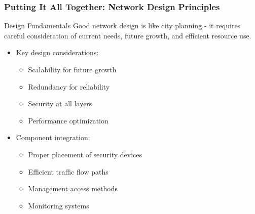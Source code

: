 \documentclass{beamer}
\begin{document}
\begin{frame}
    \frametitle{Putting It All Together: Network Design Principles}
    
    \begin{block}{Design Fundamentals}
        Good network design is like city planning - it requires careful consideration of current needs, future growth, and efficient resource use.
    \end{block}
    
    \begin{itemize}
        \item Key design considerations:
        \begin{itemize}
            \item Scalability for future growth
            \item Redundancy for reliability
            \item Security at all layers
            \item Performance optimization
        \end{itemize}
        
        \item Component integration:
        \begin{itemize}
            \item Proper placement of security devices
            \item Efficient traffic flow paths
            \item Management access methods
            \item Monitoring systems
        \end{itemize}
    \end{itemize}
\end{frame}
\end{document}
